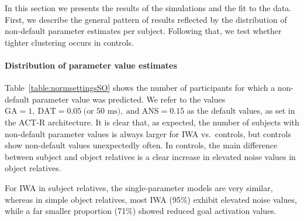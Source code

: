 \documentclass{cambridge7A}\usepackage[]{graphicx}\usepackage[]{color}
\begin{document}
\begin{table}
  \centering
  \caption{The number of participants in \textbf{subject / object relatives} (SR/OR) for which non-default parameter values were predicted, in the subject vs.\ object relative tasks, respectively; for goal activation (GA), default action time (DAT) and noise (ANS) parameters.}
  \label{table:normsettingsSO}
\end{table}

In this section we presents the results of the simulations and the fit to the data. First, we describe the general pattern of results reflected by the distribution of non-default parameter estimates per subject. Following that, we test whether tighter clustering occurs in controls.

\paragraph{Distribution of parameter value estimates} 
Table~\ref{table:normsettingsSO} shows the number of participants for which a non-default parameter value was predicted. 
We refer to the values $\text{GA} = 1,\ \text{DAT} = 0.05\ \text{(or 50 ms)},\ \text{and ANS} = 0.15$ as the default values, as set in the ACT-R architecture.
It is clear that, as expected, the number of subjects with non-default parameter values is always larger for IWA vs.\ controls, but controls show non-default values unexpectedly often.
In controls, the main difference between subject and object relatives is a clear increase in elevated noise values in object relatives.

For IWA in subject relatives, the single-parameter models are very similar, whereas in simple object relatives, most IWA (95\%) exhibit elevated noise values, while a far smaller proportion (71\%) showed reduced goal activation values. 
\end{document}
